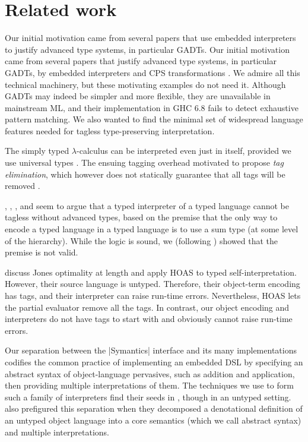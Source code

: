 \section{Related work}\label{related}

\ifshort
Our initial motivation came from several papers 
\citep{WalidICFP02,taha-tag,xi-guarded,peyton-jones-simple}
that use embedded interpreters to justify advanced
type systems, in particular GADTs.
\else
Our initial motivation came from several papers that justify advanced
type systems, in particular GADTs, by embedded interpreters
\citep{WalidICFP02,taha-tag,xi-guarded,peyton-jones-simple} and
CPS transformations \citep{Guillemette-Monier-PLPV,shao-type-toplas,chen-typeful}.
\fi
We admire all this technical machinery, but
these motivating examples do not need it.
Although GADTs may indeed be simpler and more flexible, they are
unavailable in mainstream ML, and their implementation in GHC
6.8 fails to
detect exhaustive pattern matching.  We also wanted to find the minimal
set of widespread language features needed for tagless
type-preserving interpretation.

The simply typed $\lambda$-calculus can be interpreted even just in
itself, provided we use universal types \citep{taha-tag}.  The
ensuing tagging overhead motivated \citet{Makholm-TagElim,taha-tag} 
to propose \emph{tag
elimination}, which however does not statically guarantee that all tags
will be removed \citep{WalidICFP02}.

, \citet{taha-tag}, \citet{xi-guarded}, and
\citet{peyton-jones-simple} seem to argue that a typed
interpreter of a typed language cannot be tagless without
advanced types, based on the premise that the only way to
encode a typed language in a typed language is to use
a sum type (at some level of the hierarchy).
While the logic is sound, we (following \citet{yang-encoding}) showed that the
premise is not valid.

\citet{Danvy-tagging-encoding} discuss Jones optimality at length and
apply HOAS to typed self\hyp interpretation.  However, their source
language is untyped.  Therefore, their object\hyp term encoding has
tags, and their interpreter can raise run-time errors.
Nevertheless, HOAS lets the partial
evaluator remove all the tags. In contrast, our object encoding and
interpreters do not have tags to start with and obviously cannot
raise run-time errors.

Our separation between the |Symantics| interface and its many
implementations codifies the common practice of implementing an embedded
DSL by specifying an abstract syntax of object\hyp language pervasives,
such as addition and application, then providing multiple
interpretations of them.
The techniques we use to form such a family of interpreters
find their seeds in \citet{Holst-AMIX}, though in an untyped setting.
 also
prefigured this separation when they decomposed a denotational definition of an
untyped object language into a core semantics (which we call abstract syntax)
and multiple interpretations.

